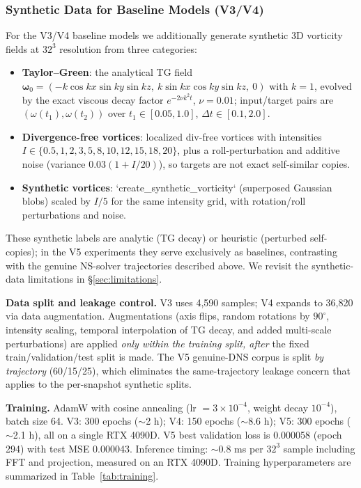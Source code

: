 \documentclass[review]{elsarticle}
\begin{document}
\subsubsection{Synthetic Data for Baseline Models (V3/V4)}

For the V3/V4 baseline models we additionally generate synthetic 3D vorticity fields at $32^3$ resolution from three categories:
\begin{itemize}
    \item \textbf{Taylor--Green}: the analytical TG field $\bm\omega_0 =
    (-k\cos kx\sin ky\sin kz,\ k\sin kx\cos ky\sin kz,\ 0)$ with $k{=}1$, evolved by the exact
    viscous decay factor $e^{-2\nu k^2 t}$, $\nu{=}0.01$; input/target pairs are $(\omega(t_1),\omega(t_2))$
    over $t_1\in[0.05,1.0]$, $\Delta t\in[0.1,2.0]$.
    \item \textbf{Divergence-free vortices}: localized div-free vortices with intensities
    $I\in\{0.5,1,2,3,5,8,10,12,15,18,20\}$, plus a roll-perturbation and additive noise
    (variance $0.03(1+I/20)$), so targets are not exact self-similar copies.
    \item \textbf{Synthetic vortices}: `create\_synthetic\_vorticity` (superposed Gaussian blobs)
    scaled by $I/5$ for the same intensity grid, with rotation/roll perturbations and noise.
\end{itemize}
These synthetic labels are analytic (TG decay) or heuristic (perturbed self-copies); in the V5
experiments they serve exclusively as baselines, contrasting with the genuine NS-solver
trajectories described above. We revisit the synthetic-data limitations in \S\ref{sec:limitations}.

\textbf{Data split and leakage control.} V3 uses 4,590 samples; V4 expands to 36,820 via data
augmentation. Augmentations (axis flips, random rotations by $90^\circ$, intensity scaling,
temporal interpolation of TG decay, and added multi-scale perturbations) are applied
\emph{only within the training split, after} the fixed train/validation/test split is made. The
V5 genuine-DNS corpus is split \emph{by trajectory} (60/15/25), which eliminates the
same-trajectory leakage concern that applies to the per-snapshot synthetic splits.

\textbf{Training.} AdamW with cosine annealing (lr $=3\times10^{-4}$, weight decay $10^{-4}$),
batch size 64. V3: 300 epochs ($\sim$2 h); V4: 150 epochs ($\sim$8.6 h); V5: 300 epochs
($\sim$2.1 h), all on a single RTX 4090D. V5 best validation loss is 0.000058 (epoch 294) with
test MSE 0.000043. Inference timing: $\sim$0.8 ms per $32^3$ sample including FFT and projection,
measured on an RTX 4090D. Training hyperparameters are summarized in Table~\ref{tab:training}.
\end{document}
